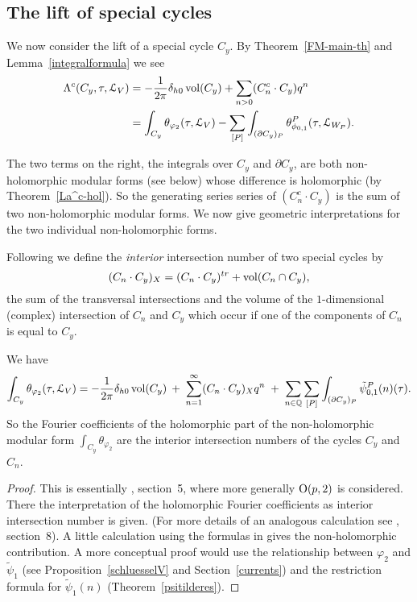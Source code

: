 \subsection{The lift of special cycles}\label{special-lift-section}

We now consider the lift of a special cycle $C_y$. By Theorem~\ref{FM-main-th} and Lemma~\ref{integralformula} we see
\begin{align}\label{special-lift}
\Lambda^c(C_y,\tau,\mathcal{L}_V) &= -\frac{1}{2\pi}\delta_{h0} \operatorname{vol}(C_y) + \sum_{n>0} ( C^c_n \cdot C_y) q^n \\
&= \int_{C_y} \theta_{\varphi_2}(\tau,\mathcal{L}_V) - \sum_{[P]}\int_{(\partial C_y)_P} \theta^P_{\phi_{0,1}}(\tau,\mathcal{L}_{W_P}). \notag
\end{align}

The two terms on the right, the integrals over $C_y$ and ${\partial C_y}$, are both non-holomorphic modular forms (see below) whose difference is holomorphic (by Theorem~\ref{La^c-hol}). So the generating series series of $(C^c_n \cdot C_y)$ is the sum of two non-holomorphic modular forms. We now give geometric interpretations for the two individual non-holomorphic forms. 

Following \cite{HZ} we define the {\it interior} intersection number of two special cycles by
\[
( C_n \cdot C_y )_X =  (C_n \cdot C_y )^{tr} + \operatorname{vol}(C_n \cap C_y),
\]
the sum of the transversal intersections and the volume of the $1$-dimensional (complex) intersection of  $C_n$ and $C_y$ which occur if one of the components of $C_n$ is equal to $C_y$. 

\begin{theorem}\label{interior-lift}
We have
\[
 \int_{C_y} \theta_{\varphi_2}(\tau,\mathcal{L}_V) = -\frac{1}{2\pi}\delta_{h0} \operatorname{vol}(C_y) \:+\; 
 \sum_{n=1}^{\infty} ( C_n \cdot C_y )_X q^n \; + \; \sum_{n \in \mathbb{Q}} \sum_{[P]} \int_{(\partial C_y)_{P}}  {\tilde{\psi}_{0,1}^P}(n)(\tau).
 \]
 So the Fourier coefficients of the holomorphic part of the non-holomorphic modular form $\int_{C_y} \theta_{\varphi_2}$ are the interior intersection numbers of the cycles $C_y$ and $C_n$. 
\end{theorem}

\begin{proof}
This is essentially \cite{FCompo}, section~5, where more generally $\operatorname{O}(p,2)$ is considered. 
There the interpretation of the holomorphic Fourier coefficients as interior intersection number is given. (For more details of an analogous calculation see \cite{FMspec}, section~8). A little calculation using the formulas in \cite{FCompo} gives the non-holomorphic contribution. A more conceptual proof would use the relationship between $\varphi_2$ and $\tilde{\psi}_1$ (see Proposition~\ref{schluesselV} and Section~\ref{currents}) and the restriction formula for $\tilde{\psi}_1(n)$ (Theorem~\ref{psitilderes}). 
\end{proof}




